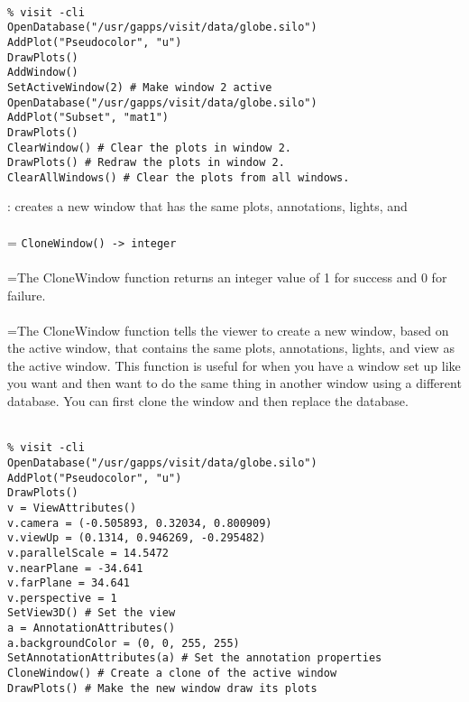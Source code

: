 \documentclass[10pt,a4paper]{report}
\begin{document}
\\[-6mm]
\begin{verbatim}% visit -cli
OpenDatabase("/usr/gapps/visit/data/globe.silo")
AddPlot("Pseudocolor", "u")
DrawPlots()
AddWindow()
SetActiveWindow(2) # Make window 2 active
OpenDatabase("/usr/gapps/visit/data/globe.silo")
AddPlot("Subset", "mat1")
DrawPlots()
ClearWindow() # Clear the plots in window 2.
DrawPlots() # Redraw the plots in window 2.
ClearAllWindows() # Clear the plots from all windows.
\end{verbatim}
\newpage


{}
: creates a new window that has the same plots, annotations, lights, and\\[-3mm]

 \\ 
\hangindent=\parindent 
\verb!CloneWindow() -> integer!\\ [-3mm]

 \\ 
\hangindent=\parindent The CloneWindow function returns an integer value of 1 for success and 0 for failure. \\[-3mm] 

 \\ 
\hangindent=\parindent The CloneWindow function tells the viewer to create a new window, based on the active window, that contains the same plots, annotations, lights, and view as the active window. This function is useful for when you have a window set up like you want and then want to do the same thing in another window using a different database. You can first clone the window and then replace the database. \\[-3mm] 

\\[-6mm]
\begin{verbatim}% visit -cli
OpenDatabase("/usr/gapps/visit/data/globe.silo")
AddPlot("Pseudocolor", "u")
DrawPlots()
v = ViewAttributes()
v.camera = (-0.505893, 0.32034, 0.800909)
v.viewUp = (0.1314, 0.946269, -0.295482)
v.parallelScale = 14.5472
v.nearPlane = -34.641
v.farPlane = 34.641
v.perspective = 1
SetView3D() # Set the view
a = AnnotationAttributes()
a.backgroundColor = (0, 0, 255, 255)
SetAnnotationAttributes(a) # Set the annotation properties
CloneWindow() # Create a clone of the active window
DrawPlots() # Make the new window draw its plots
\end{verbatim}
\newpage
\end{document}
